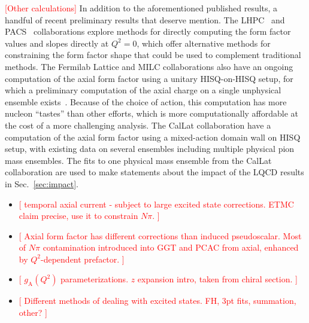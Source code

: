 \textcolor{red}{[Other calculations]}
In addition to the aforementioned published results, 
 a handful of recent preliminary results that deserve mention.
The LHPC~\cite{Hasan:2017wwt} and PACS~\cite{Ishikawa:2021eut} collaborations
 explore methods for directly computing the form factor values and slopes
 directly at $Q^2=0$, which offer alternative methods for constraining
 the form factor shape that could be used to complement traditional methods.
The Fermilab Lattice and MILC collaborations also have an ongoing
 computation of the axial form factor using a unitary HISQ-on-HISQ setup,
 for which a preliminary computation of the axial charge on
 a single unphysical ensemble exists~\cite{Lin:2020wko}.
Because of the choice of action, this computation has more nucleon ``tastes''
 than other efforts, which is more computationally affordable
 at the cost of a more challenging analysis.
The CalLat collaboration have a computation of the axial form factor
 using a mixed-action domain wall on HISQ setup,
 with existing data on several ensembles including multiple physical pion mass ensembles.
The fits to one physical mass ensemble from the CalLat collaboration are used
 to make statements about the  impact of the LQCD results in Sec.~\ref{sec:impact}.

\begin{itemize}
\item
\textcolor{red}{[
 temporal axial current - subject to large excited state corrections.
 ETMC claim precise, use it to constrain $N\pi$.
]}
\item
\textcolor{red}{[
 Axial form factor has different corrections than induced pseudoscalar.
 Most of $N\pi$ contamination introduced into GGT and PCAC from axial,
 enhanced by $Q^2$-dependent prefactor.
]}
\item
\textcolor{red}{[
 $g_{\mathrm{A}}(Q^2)$ parameterizations.
 $z$ expansion intro, taken from chiral section.
]}
\item
\textcolor{red}{[
 Different methods of dealing with excited states.
 FH, 3pt fits, summation, other?
]}
\end{itemize}

